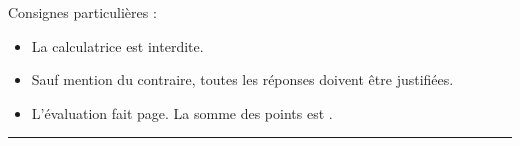 
\def\arraystretch{1}
\setlength\tabcolsep{10pt}

\SetDate[22/02/2026]
\reversemarginpar
\setlength{\marginparsep}{.5cm}


\pagestyle{fancy}
\fancyhead[R]{\today}

\null\vspace{-20pt}
Consignes particulières : 
\begin{itemize}[label=$\bullet$]
	\item 
	La calculatrice est {interdite}.
	\item
	Sauf mention du contraire, toutes les réponses doivent être justifiées.
	\item
	L'évaluation fait \pageref{lastpage} page. La somme des points est .
\end{itemize}

\marginpar{[pts]}
\hrule


